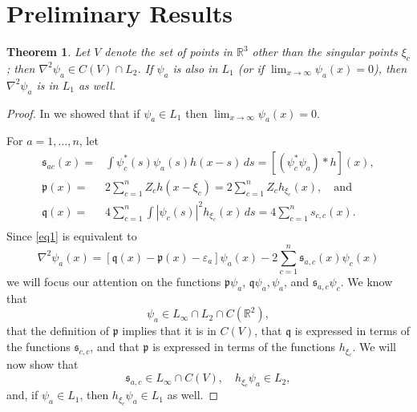\documentclass[english, reqno]{amsart}
\newtheorem{thm}{Theorem}[]
\newcommand{\IR}{\text{${\mathbb{R}}$}}
\newcommand{\p}{\mathfrak{p}}
\newcommand{\q}{\mathfrak{q}}
\newcommand{\s}{\mathfrak{s}}
\begin{document}
\section{Preliminary Results} \label{section 3}
\begin{thm} \label{thm1} Let $V$ denote the set of points in $\IR^3$ other than the singular points $\xi_c$; then 
$\nabla^2\psi_a \in C(V) \cap L_2$. If $\psi_a$ is also in $L_1$ (or if $\lim_{x\rightarrow \infty}\psi_a(x)=0$), then $\nabla^2\psi_a $ is in $L_1$ as well.
\end{thm}
\begin{proof}
In \cite{Za1} we showed that if $\psi_a \in L_1$ then $\lim_{x\rightarrow \infty} \psi_a(x)=0$.

For $a=1, \dots, n$, let 
\begin{equation*} 
\begin{split}
\s_{a c}(x)= &\int \psi_c^{\ast}(s)\psi_a(s) h(x-s)\,ds=[(\psi_c^{\ast} \psi_a)\ast h](x),\\
\p(x)= &2\sum_{c=1}^n Z_c h(x-\xi_c)=2\sum_{c=1}^n Z_c h_{\xi_c}(x),  \quad\text{and}\\
\q(x)=  & 4\sum_{c=1}^n \int |\psi_c(s)|^2h_{\xi_c}(x)\,ds  = 4\sum_{c=1}^n  s_{c,c}(x).\\
\end{split}
\end{equation*}
Since \eqref{eq1} is equivalent to
\begin{equation} \label{eq2}
\nabla^2\psi_a(x)=[\q(x)-\p(x) -\varepsilon_a]\psi_a(x)-2\sum_{c=1}^n\s_{a,c}(x)\psi_c(x)
\end{equation}
we will focus our attention on the functions  $\p\psi_a$, $\q\psi_a, \psi_a$, and $\s_{a,c}\psi_c$. We know that
\[
\psi_a \in L_{\infty}\cap L_2 \cap C(\IR^2),
\]
that the definition of $\p$ implies that it is in $C(V)$, that $\q$ is expressed in terms of the functions $\s_{c,c}$, and that
$\p$ is expressed in terms of the functions $h_{\xi_c}$.  We will now show that
\begin{equation} \label{eq3}
\s_{a,c} \in L_{\infty} \cap C(V), \quad  h_{\xi_c} \psi_a \in L_2 ,
\end{equation}
and, if $\psi_a \in L_1$, then $h_{\xi_c} \psi_a \in L_1$ as well.


\end{proof}
\end{document}
